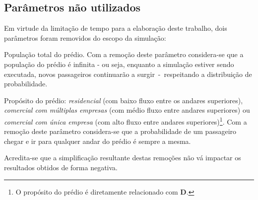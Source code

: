 \subsection{Parâmetros não utilizados}

Em virtude da limitação de tempo para a elaboração deste trabalho, dois
parâmetros foram removidos do escopo da simulação:

\begin{description}[leftmargin=!,labelwidth=\widthof{\bfseries Pu}]
  \item[P]
  População total do prédio. Com a remoção deste parâmetro considera-se que a
  população do prédio é infinita - ou seja, enquanto a simulação estiver sendo
  executada, novos passageiros continuarão a surgir~-~respeitando a distribuição
  de probabilidade.

  \item[Pu]
  Propósito do prédio: \textit{residencial} (com baixo fluxo entre os andares
  superiores), \textit{comercial com múltiplas empresas} (com médio fluxo entre
  andares superiores) ou \textit{comercial com única empresa} (com alto fluxo
  entre andares superiores)\footnote{O propósito do prédio é diretamente
  relacionado com \textbf{D}.}. Com a remoção deste parâmetro considera-se que
  a probabilidade de um passageiro chegar e ir para qualquer andar do prédio é
  sempre a mesma.
\end{description}

Acredita-se que a simplificação resultante destas remoções não vá impactar os
resultados obtidos de forma negativa.

